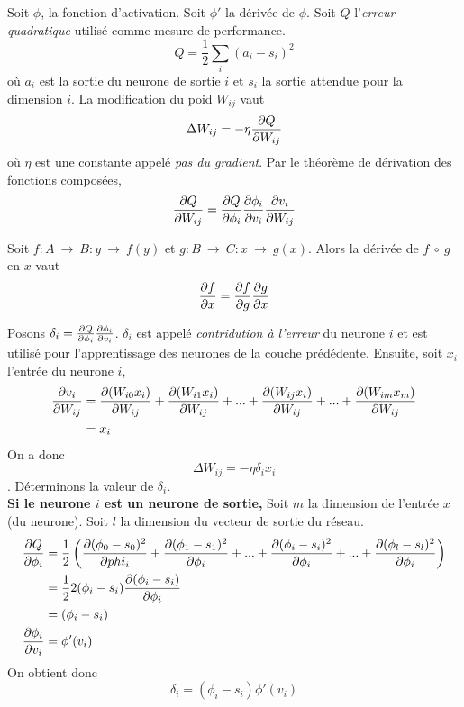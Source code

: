 Soit $\phi$, la fonction d'activation. Soit $\phi'$ la dérivée de $\phi$. Soit $Q$ l'\emph{erreur quadratique} utilisé comme mesure de performance.
\[Q = \frac{1}{2}\sum_{i}(a_i-s_i)^2\] où $a_i$ est la sortie du neurone de sortie $i$ et $s_i$ la sortie attendue pour la dimension $i$.
La modification du poid $W_{ij}$ vaut \[\Delta W_{ij} = -\eta\frac{\partial Q}{\partial W_{ij}}\] où $\eta$ est une constante appelé \emph{pas du gradient}.
Par le théorème de dérivation des fonctions composées, \[\frac{\partial Q}{\partial W_{ij}} = \frac{\partial Q}{\partial \phi_i} \frac{\partial \phi_i}{\partial v_i} \frac{\partial v_i}{\partial W_{ij}}\]
\begin{thm}
Soit $f:A~\rightarrow~B : y~\rightarrow~f(y)$ et $g:B~\rightarrow~C : x~\rightarrow~g(x)$. Alors la dérivée de $f~\circ~g$ en $x$ vaut
\[\frac{\partial f}{\partial x} = \frac{\partial f}{\partial g} \frac{\partial g}{\partial x}\]
\end{thm}
Posons $\delta_i = \frac{\partial Q}{\partial \phi_i} \frac{\partial \phi_i}{\partial v_i}$. $\delta_i$ est appelé \emph{contridution à l'erreur} du neurone $i$ et est utilisé pour l'apprentissage des neurones de la couche prédédente.
Ensuite, soit $x_i$ l'entrée du neurone $i$,
\begin{equation}
 \begin{split}
  \frac{\partial v_i}{\partial W_{ij}} & = \frac{\partial (W_{i0}x_i)}{\partial W_{ij}} + \frac{\partial (W_{i1}x_i)}{\partial W_{ij}} + ... + \frac{\partial (W_{ij}x_i)}{\partial W_{ij}} + ... + \frac{\partial (W_{im}x_m)}{\partial W_{ij}}\\
  ~ & = x_i
  \end{split}
\end{equation}
On a donc \[\Delta W_{ij} = -\eta \delta_i x_i\].
Déterminons la valeur de $\delta_i$.\\

\textbf{Si le neurone $i$ est un neurone de sortie,}
Soit $m$ la dimension de l'entrée $x$ (du neurone). Soit $l$ la dimension du vecteur de sortie du réseau.
\begin{equation}
 \begin{split}
  \frac{\partial Q}{\partial \phi_i} & = \frac{1}{2} \left( \frac{\partial (\phi_0 - s_0)^2}{\partial phi_i} + \frac{\partial (\phi_1 - s_1)^2}{\partial \phi_i} + ... + \frac{\partial (\phi_i - s_i)^2}{\partial \phi_i} + ... + \frac{\partial (\phi_l - s_l)^2}{\partial \phi_i} \right)\\
  ~ & = \frac{1}{2}2(\phi_i - s_i)\frac{\partial (\phi_i - s_i)}{\partial \phi_i}\\
  ~ & = (\phi_i - s_i)\\
  \frac{\partial \phi_i}{\partial v_i} & = \phi'(v_i)
 \end{split}
\end{equation}\label{eq:a}
On obtient donc \[\delta_i = (\phi_i - s_i)\phi'(v_i)\]\\

